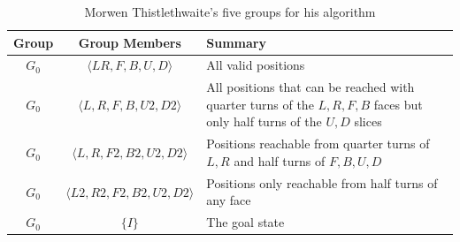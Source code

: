 \documentclass{article}
\begin{document}
\begin{table}[h]
  \begin{center}
    \caption{Morwen Thistlethwaite's five groups for his algorithm \cite{Singmaster1981}}
    \label{tab:table1}
    \renewcommand{\arraystretch}{1.75}
    \begin{tabularx}{\textwidth}{ccX}
      \toprule
      \textbf{Group} & \textbf{Group Members} & \textbf{Summary}\\
      \midrule
      $G_0$ & $\langle L R, F, B, U, D\rangle$ & All valid positions \\
      $G_0$ & $\langle L, R, F, B, U2, D2\rangle$ & All positions that can be reached with quarter turns of the $L, R, F, B$ faces but only half turns of the $U, D$ slices \\
      $G_0$ & $\langle L, R, F2, B2, U2, D2\rangle$ & Positions reachable from quarter turns of $L, R$ and half turns of $F, B, U, D$\\
			$G_0$ & $\langle L2, R2, F2, B2, U2, D2\rangle$ & Positions only reachable from half turns of any face\\
      $G_0$ & $\{I\}$ & The goal state\\
      \bottomrule
    \end{tabularx}
  \end{center}
\end{table}
\renewcommand{\arraystretch}{1}

\begin{appendix}
\newpage  
\listoffigures
\listoftables
\newpage


\end{appendix}
\end{document}
